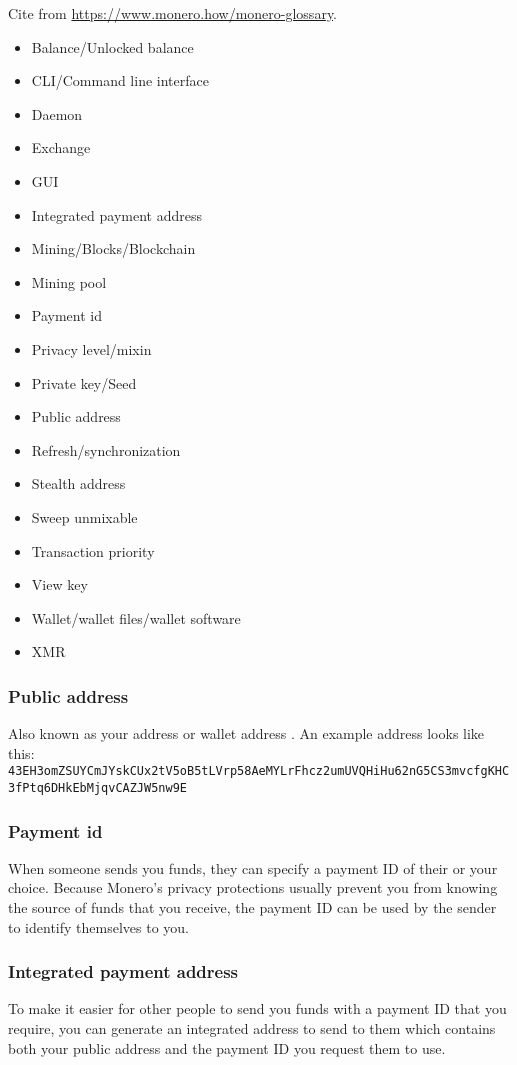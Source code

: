 	Cite from \url{https://www.monero.how/monero-glossary}.
	\begin{itemize}
		\item Balance/Unlocked balance
		\item CLI/Command line interface
		\item Daemon
		\item Exchange
		\item GUI
		\item Integrated payment address
		\item Mining/Blocks/Blockchain
		\item Mining pool
		\item Payment id
		\item Privacy level/mixin
		\item Private key/Seed
		\item Public address
		\item Refresh/synchronization
		\item Stealth address
		\item Sweep unmixable
		\item Transaction priority
		\item View key
		\item Wallet/wallet files/wallet software
		\item XMR
	\end{itemize}
\subsubsection{Public address}
	Also known as your address or wallet address . An example address looks like this:\\ 
	\lstinline!43EH3omZSUYCmJYskCUx2tV5oB5tLVrp58AeMYLrFhcz2umUVQHiHu62nG5CS3mvcfgKHC3fPtq6DHkEbMjqvCAZJW5nw9E!
\subsubsection{Payment id}
	When someone sends you funds, they can specify a payment ID of their or your choice. Because Monero's privacy protections usually prevent you from knowing the source of funds that you receive, the payment ID can be used by the sender to identify themselves to you.
\subsubsection{Integrated payment address}
	To make it easier for other people to send you funds with a payment ID that you require, you can generate an integrated address to send to them which contains both your public address and the payment ID you request them to use.
